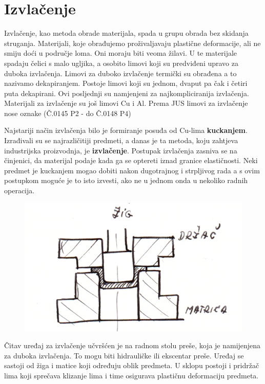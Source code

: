 \documentclass[a4paper,12pt]{article}
\numberwithin{figure}{section}
\begin{document}
\section{Izvlačenje}
Izvlačenje, kao metoda obrade materijala, spada u grupu obrada bez skidanja struganja. Materijali, koje obrađujemo proživaljavaju plastične deformacije, ali ne smiju doći u područje loma. Oni moraju biti veoma žilavi. U te materijale spadaju čelici s malo ugljika, a osobito limovi koji su  predviđeni upravo za duboka izvlačenja. Limovi za duboko izvlačenje termički su obrađena a to nazivamo dekapiranjem. Postoje limovi koji su jednom, dvaput pa čak i četiri puta dekapirani. Ovi posljednji su namjenjeni za najkompliciranija izvlačenja. Materijali za izvlačenje su još limovi Cu i Al. Prema JUS limovi za izvlačenje nose oznake (Č.0145 P2 - do Č.0148 P4)\par  
Najstariji način izvlačenja bilo je formiranje posuđa od Cu-lima \textbf{kuckanjem}. Izrađivali su se najrazličitiji predmeti, a danas je ta metoda, koju zahtjeva industrijska proizvodnja, je \textbf{izvlačenje}. Postupak izvlačenja zasniva se na činjenici, da materijal podaje kada ga se optereti iznad granice elastičnosti. Neki predmet je kuckanjem mogao dobiti nakon dugotrajnog i strpljivog rada a s ovim postupkom moguće je to isto izvesti, ako ne u jednom onda u nekoliko radnih operacija. \par
\begin{figure}[!h]
\centering
\includegraphics[scale=0.15]{image_45-1.png}
\end{figure}
\FloatBarrier
Čitav uređaj za izvlačenje učvršćen je na radnom stolu preše, koja je namijenjena za duboka izvlačenja. To mogu biti hidrauličke ili ekscentar preše. Uređaj se sastoji od žiga i matice koji određuju oblik predmeta. U sklopu postoji i pridržač lima koji sprečava klizanje lima i time osigurava plastičnu deformaciju predmeta. \par
\end{document}
